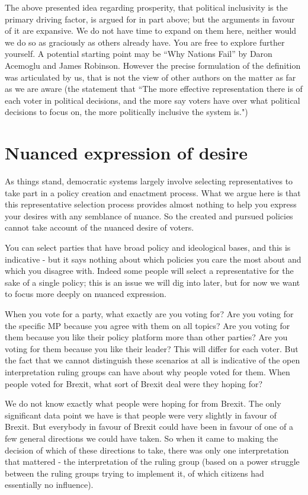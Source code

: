 \documentclass[twoside]{article}
\theoremstyle{definition}
\begin{document}
The above presented idea regarding prosperity, that political inclusivity is the primary driving factor, is argued for in part above; but the arguments in favour of it are expansive. We do not have time to expand on them here, neither would we do so as graciously as others already have. You are free to explore further yourself. A potential starting point may be “Why Nations Fail” by Daron Acemoglu and James Robinson. However the precise formulation of the definition was articulated by us, that is not the view of other authors on the matter as far as we are aware (the statement that ``The more effective representation there is of each voter in political decisions, and the more say voters have over what political decisions to focus on, the more politically inclusive the system is.")

\section{Nuanced expression of desire}

As things stand, democratic systems largely involve selecting representatives to take part in a policy creation and enactment process. What we argue here is that this representative selection process provides almost nothing to help you express your desires with any semblance of nuance. So the created and pursued policies cannot take account of the nuanced desire of voters.

You can select parties that have broad policy and ideological bases, and this is indicative - but it says nothing about which policies you care the most about and which you disagree with. Indeed some people will select a representative for the sake of a single policy; this is an issue we will dig into later, but for now we want to focus more deeply on nuanced expression.

When you vote for a party, what exactly are you voting for? Are you voting for the specific MP because you agree with them on all topics? Are you voting for them because you like their policy platform more than other parties? Are you voting for them because you like their leader? This will differ for each voter. But the fact that we cannot distinguish these scenarios at all is indicative of the open interpretation ruling groups can have about why people voted for them. When people voted for Brexit, what sort of Brexit deal were they hoping for?

We do not know exactly what people were hoping for from Brexit. The only significant data point we have is that people were very slightly in favour of Brexit. But everybody in favour of Brexit could have been in favour of one of a few general directions we could have taken. So when it came to making the decision of which of these directions to take, there was only one interpretation that mattered - the interpretation of the ruling group (based on a power struggle between the ruling groups trying to implement it, of which citizens had essentially no influence).
\end{document}
